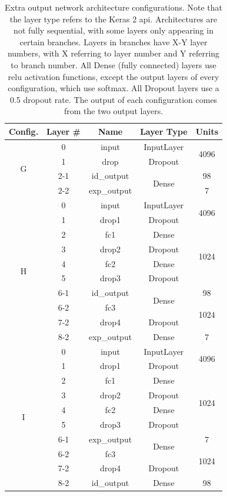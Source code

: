 \begin{table}[h!]
\begin{center}
\begin{tabular}{|c|c|c|c|c|}
\hline
\textbf{Config.} & \textbf{Layer \#} & \textbf{Name} & \textbf{Layer Type} & \textbf{Units} \\ \hline
\multirow{4}{*}{G} & 0 & input & InputLayer & \multirow{2}{*}{4096} \\ \cline{2-4}
& 1 & drop & Dropout & \\ \cline{2-5}
& 2-1 & id\_output & \multirow{2}{*}{Dense} & 98 \\ \cline{2-3} \cline{5-5}
& 2-2 & exp\_output & & 7 \\ \hline
\multirow{10}{*}{H} & 0 & input & InputLayer & \multirow{2}{*}{4096} \\ \cline{2-4}
& 1 & drop1 & Dropout & \\ \cline{2-5}
& 2 & fc1 & Dense & \multirow{4}{*}{1024} \\ \cline{2-4}
& 3 & drop2 & Dropout & \\ \cline{2-4}
& 4 & fc2 & Dense & \\ \cline{2-4}
& 5 & drop3 & Dropout & \\ \cline{2-5}
& 6-1 & id\_output & \multirow{2}{*}{Dense} & 98 \\ \cline{2-3} \cline{5-5}
& 6-2 & fc3 & & \multirow{2}{*}{1024} \\ \cline{2-4}
& 7-2 & drop4 & Dropout & \\ \cline{2-5}
& 8-2 & exp\_output & Dense & 7 \\ \hline
\multirow{10}{*}{I} & 0 & input & InputLayer & \multirow{2}{*}{4096} \\ \cline{2-4}
& 1 & drop1 & Dropout & \\ \cline{2-5}
& 2 & fc1 & Dense & \multirow{4}{*}{1024} \\ \cline{2-4}
& 3 & drop2 & Dropout & \\ \cline{2-4}
& 4 & fc2 & Dense & \\ \cline{2-4}
& 5 & drop3 & Dropout & \\ \cline{2-5}
& 6-1 & exp\_output & \multirow{2}{*}{Dense} & 7 \\ \cline{2-3} \cline{5-5}
& 6-2 & fc3 & & \multirow{2}{*}{1024} \\ \cline{2-4}
& 7-2 & drop4 & Dropout & \\ \cline{2-5}
& 8-2 & id\_output & Dense & 98 \\ \hline
\end{tabular}
\end{center}
\caption[Extra output architecture configurations]{Extra output network architecture configurations. Note that the layer type refers to the Keras 2 \acrshort{api}. Architectures are not fully sequential, with some layers only appearing in certain branches. Layers in branches have X-Y layer numbers, with X referring to layer number and Y referring to branch number. All Dense (fully connected) layers use \acrshort{relu} activation functions, except the output layers of every configuration, which use softmax. All Dropout layers use a 0.5 dropout rate. The output of each configuration comes from the two output layers.}
\label{tab:ex-out-arch}
\end{table}


\cleardoublepage